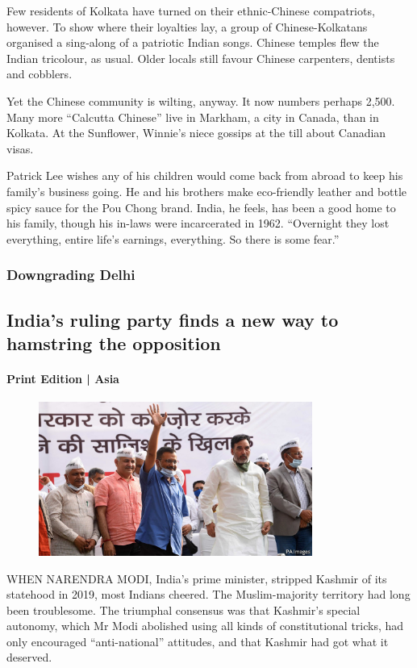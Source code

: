 \documentclass{article}
\begin{document}
Few residents of Kolkata have turned on their ethnic-Chinese compatriots, however. To show where their loyalties lay, a group of Chinese-Kolkatans organised a sing-along of a patriotic Indian songs. Chinese temples flew the Indian tricolour, as usual. Older locals still favour Chinese carpenters, dentists and cobblers. 

Yet the Chinese community is wilting, anyway. It now numbers perhaps 2,500. Many more ``Calcutta Chinese'' live in Markham, a city in Canada, than in Kolkata. At the Sunflower, Winnie's niece gossips at the till about Canadian visas. 

Patrick Lee wishes any of his children would come back from abroad to keep his family's business going. He and his brothers make eco-friendly leather and bottle spicy sauce for the Pou Chong brand. India, he feels, has been a good home to his family, though his in-laws were incarcerated in 1962. ``Overnight they lost everything, entire life's earnings, everything. So there is some fear.'' {} 
\clearpage
\subsubsection{Downgrading Delhi }
\subsection{India's ruling party finds a new way to hamstring the opposition }
\paragraph{Print Edition | Asia  \quad \color{gray}{Mar 25th 2021 }}
\begin{figure}[h]
\centering
\includegraphics[width=0.8\textwidth]{images/20210327_asp503.jpg}
\end{figure}
\lettrine{W}HEN NARENDRA MODI, India's prime minister, stripped Kashmir of its statehood in 2019, most Indians cheered. The Muslim-majority territory had long been troublesome. The triumphal consensus was that Kashmir's special autonomy, which Mr Modi abolished using all kinds of constitutional tricks, had only encouraged ``anti-national'' attitudes, and that Kashmir had got what it deserved. 
\end{document}
